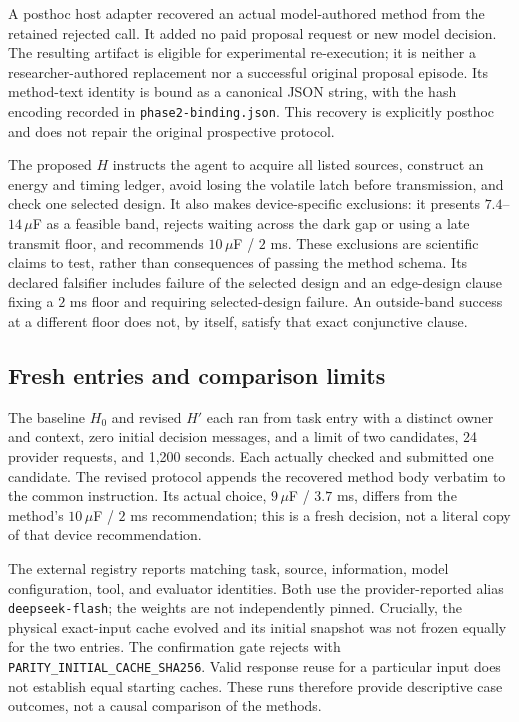 A posthoc host adapter recovered an actual model-authored method from the
retained rejected call. It added no paid proposal request or new model decision.
The resulting artifact is eligible for experimental re-execution; it is neither
a researcher-authored replacement nor a successful original proposal episode.
Its method-text identity is bound as a canonical JSON string, with the hash
encoding recorded in \texttt{phase2-binding.json}. This recovery is explicitly
posthoc and does not repair the original prospective protocol.

The proposed $H$ instructs the agent to acquire all listed sources, construct
an energy and timing ledger, avoid losing the volatile latch before transmission,
and check one selected design. It also makes device-specific exclusions:
it presents $7.4$--$14\,\mu$F as a feasible band, rejects waiting across the
dark gap or using a late transmit floor, and recommends $10\,\mu$F / $2$ ms.
These exclusions are scientific claims to test, rather than consequences of
passing the method schema. Its declared falsifier includes failure of the
selected design and an edge-design clause fixing a $2$ ms floor and requiring
selected-design failure. An outside-band success at a different floor does
not, by itself, satisfy that exact conjunctive clause.

\subsection{Fresh entries and comparison limits}
The baseline $H_0$ and revised $H'$ each ran from task entry with a distinct
owner and context, zero initial decision messages, and a limit of two candidates,
24 provider requests, and 1,200 seconds. Each actually checked and submitted
one candidate. The revised protocol appends the recovered method body verbatim
to the common instruction. Its actual choice, $9\,\mu$F / $3.7$ ms, differs
from the method's $10\,\mu$F / $2$ ms recommendation; this is a fresh decision,
not a literal copy of that device recommendation.

The external registry reports matching task, source, information, model
configuration, tool, and evaluator identities. Both use the provider-reported
alias \texttt{deepseek-flash}; the weights are not independently pinned.
Crucially, the physical exact-input cache evolved and its initial snapshot was
not frozen equally for the two entries. The confirmation gate rejects with
\texttt{PARITY\_INITIAL\_CACHE\_SHA256}. Valid response reuse for a particular
input does not establish equal starting caches. These runs therefore provide
descriptive case outcomes, not a causal comparison of the methods.

